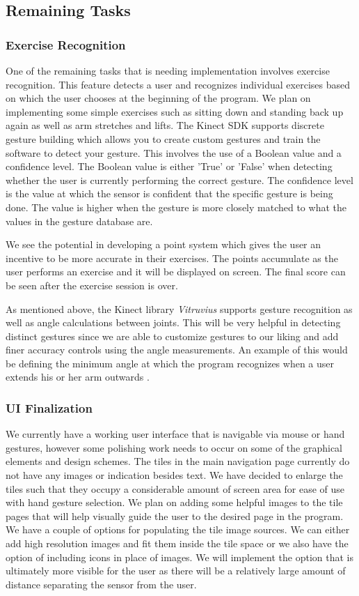 \documentclass[onecolumn, draftclsnofoot,10pt, compsoc]{IEEEtran}
\begin{document}
\subsection{Remaining Tasks}
\subsubsection{Exercise Recognition}
One of the remaining tasks that is needing implementation involves exercise recognition. This feature detects a user and recognizes individual exercises based on which the user chooses at the beginning of the program. We plan on implementing some simple exercises such as sitting down and standing back up again as well as arm stretches and lifts. The Kinect SDK supports discrete gesture building which allows you to create custom gestures and train the software to detect your gesture. This involves the use of a Boolean value and a confidence level. The Boolean value is either 'True' or 'False' when detecting whether the user is currently performing the correct gesture. The confidence level is the value at which the sensor is confident that the specific gesture is being done. The value is higher when the gesture is more closely matched to what the values in the gesture database are.

We see the potential in developing a point system which gives the user an incentive to be more accurate in their exercises. The points accumulate as the user performs an exercise and it will be displayed on screen. The final score can be seen after the exercise session is over.

As mentioned above, the Kinect library \textit{Vitruvius} supports gesture recognition as well as angle calculations between joints. This will be very helpful in detecting distinct gestures since we are able to customize gestures to our liking and add finer accuracy controls using the angle measurements. An example of this would be defining the minimum angle at which the program recognizes when a user extends his or her arm outwards \cite{Vitruvius}.


\subsubsection{UI Finalization}
We currently have a working user interface that is navigable via mouse or hand gestures, however some polishing work needs to occur on some of the graphical elements and design schemes. The tiles in the main navigation page currently do not have any images or indication besides text. We have decided to enlarge the tiles such that they occupy a considerable amount of screen area for ease of use with hand gesture selection. We plan on adding some helpful images to the tile pages that will help visually guide the user to the desired page in the program. We have a couple of options for populating the tile image sources. We can either add high resolution images and fit them inside the tile space or we also have the option of including icons in place of images. We will implement the option that is ultimately more visible for the user as there will be a relatively large amount of distance separating the sensor from the user. 
\end{document}
